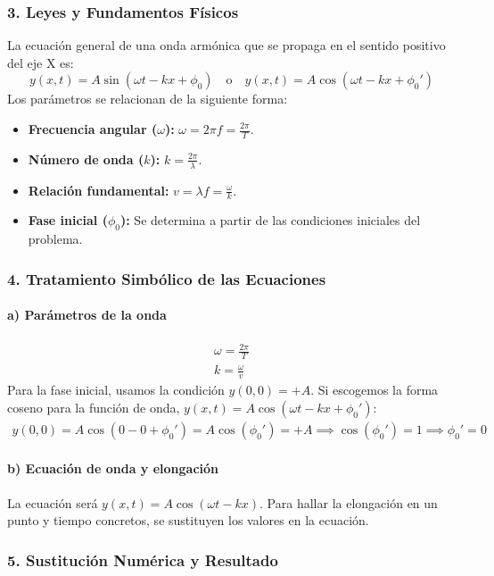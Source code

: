 \subsubsection*{3. Leyes y Fundamentos Físicos}
La ecuación general de una onda armónica que se propaga en el sentido positivo del eje X es:
$$ y(x,t) = A\sin(\omega t - kx + \phi_0) \quad \text{o} \quad y(x,t) = A\cos(\omega t - kx + \phi_0') $$
Los parámetros se relacionan de la siguiente forma:
\begin{itemize}
    \item \textbf{Frecuencia angular ($\omega$):} $\omega = 2\pi f = \frac{2\pi}{T}$.
    \item \textbf{Número de onda ($k$):} $k = \frac{2\pi}{\lambda}$.
    \item \textbf{Relación fundamental:} $v = \lambda f = \frac{\omega}{k}$.
    \item \textbf{Fase inicial ($\phi_0$):} Se determina a partir de las condiciones iniciales del problema.
\end{itemize}

\subsubsection*{4. Tratamiento Simbólico de las Ecuaciones}
\paragraph*{a) Parámetros de la onda}
\begin{gather}
    \omega = \frac{2\pi}{T} \\
    k = \frac{\omega}{v}
\end{gather}
Para la fase inicial, usamos la condición $y(0,0)=+A$. Si escogemos la forma coseno para la función de onda, $y(x,t) = A\cos(\omega t - kx + \phi_0')$:
\begin{gather}
    y(0,0) = A\cos(0-0+\phi_0') = A\cos(\phi_0') = +A \implies \cos(\phi_0')=1 \implies \phi_0'=0
\end{gather}
\paragraph*{b) Ecuación de onda y elongación}
La ecuación será $y(x,t) = A\cos(\omega t - kx)$. Para hallar la elongación en un punto y tiempo concretos, se sustituyen los valores en la ecuación.

\subsubsection*{5. Sustitución Numérica y Resultado}

